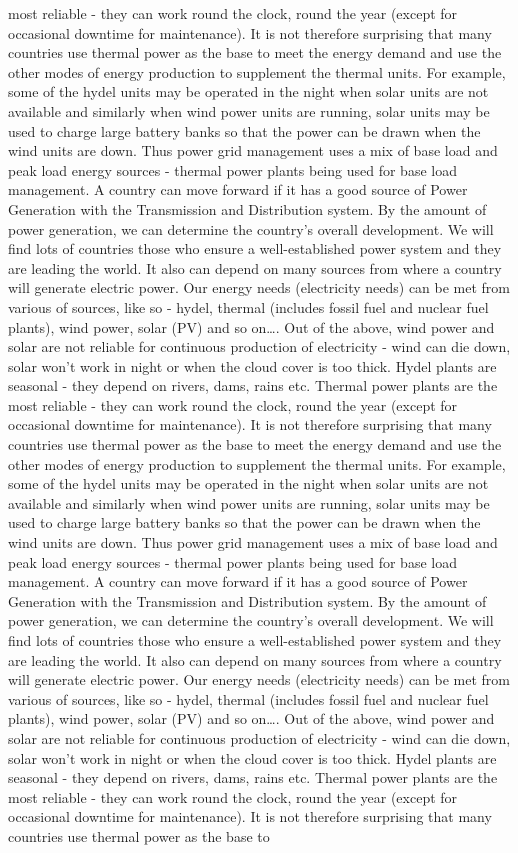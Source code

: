 \documentclass[10pt, a4paper]{article}
\begin{document}
most reliable - they can work round the clock, round the year (except for occasional downtime for maintenance). It is not therefore surprising that many countries use thermal power as the base to meet the energy demand and use the other modes of energy production to supplement the thermal units. For example, some of the hydel units may be operated in the night when solar units are not available and similarly when wind power units are running, solar units may be used to charge large battery banks so that the power can be drawn when the wind units are down. Thus power grid management uses a mix of base load and peak load energy sources - thermal power plants being used for base load management. A country can move forward if it has a good source of Power Generation with the Transmission and Distribution system. By the amount of power generation, we can determine the country’s overall development. We will find lots of countries those who ensure a well-established power system and they are leading the world. It also can depend on many sources from where a country will generate electric power. Our energy needs (electricity needs) can be met from various of sources, like so - hydel, thermal (includes fossil fuel and nuclear fuel plants), wind power, solar (PV) and so on\dots. Out of the above, wind power and solar are not reliable for continuous production of electricity - wind can die down, solar won’t work in night or when the cloud cover is too thick. Hydel plants are seasonal - they depend on rivers, dams, rains etc. Thermal power plants are the most reliable - they can work round the clock, round the year (except for occasional downtime for maintenance). It is not therefore surprising that many countries use thermal power as the base to meet the energy demand and use the other modes of energy production to supplement the thermal units. For example, some of the hydel units may be operated in the night when solar units are not available and similarly when wind power units are running, solar units may be used to charge large battery banks so that the power can be drawn when the wind units are down. Thus power grid management uses a mix of base load and peak load energy sources - thermal power plants being used for base load management. A country can move forward if it has a good source of Power Generation with the Transmission and Distribution system. By the amount of power generation, we can determine the country’s overall development. We will find lots of countries those who ensure a well-established power system and they are leading the world. It also can depend on many sources from where a country will generate electric power. Our energy needs (electricity needs) can be met from various of sources, like so - hydel, thermal (includes fossil fuel and nuclear fuel plants), wind power, solar (PV) and so on\dots. Out of the above, wind power and solar are not reliable for continuous production of electricity - wind can die down, solar won’t work in night or when the cloud cover is too thick. Hydel plants are seasonal - they depend on rivers, dams, rains etc. Thermal power plants are the most reliable - they can work round the clock, round the year (except for occasional downtime for maintenance). It is not therefore surprising that many countries use thermal power as the base to 
\end{document}
